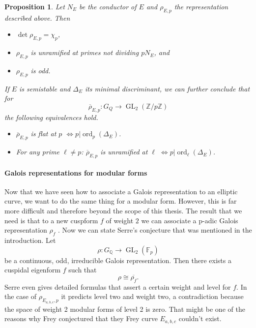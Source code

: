 \documentclass{article}
\theoremstyle{plain}%
\newtheorem{proposition}[theorem]{Proposition}
\theoremstyle{definition}
\theoremstyle{remark}
\newcommand{\GL}{\operatorname{GL}}
\begin{document}
\begin{proposition}\cite[chapter 1, theorem 2.11]{Cornell1997}\label{prop:rhoEpproperties} 
    Let \(N_E\) be the conductor of \(E\) and \(\rho_{E,p}\) the representation described above.
    Then
    \begin{itemize}
        \item \(\det \rho_{E,p} = \chi_p\),
        \item \(\rho_{E,p}\) is unramified at primes not dividing \(pN_E\), and
        \item \(\rho_{E, p}\) is odd.
    \end{itemize}
    If \(E\) is semistable and \(\Delta_E\) its minimal discriminant, we can further conclude that for
    \[
        \overline{\rho}_{E,p}\colon G_Q \to \GL_2(\mathbb{Z}/p\mathbb{Z})  
    \]
    the following equivalences hold.
    \begin{itemize}
        \item \(\overline{\rho}_{E,p}\) is flat at \(p\) \(\Leftrightarrow p| \operatorname{ord}_p(\Delta_E)\).
        \item For any prime \(\ell \neq p\): 
        \(\overline{\rho}_{E,p}\) is unramified at \(\ell\) \(\Leftrightarrow p| \operatorname{ord}_\ell(\Delta_E)\).
    \end{itemize}
\end{proposition}

\paragraph{Galois representations for modular forms}
Now that we have seen how to associate a Galois representation to an elliptic curve, we want to
do the same thing for a modular form. However, this is far more difficult and therefore beyond 
the scope of this thesis.
The result that we need is that to a new cuspform \(f\) of weight \(2\) we can associate a p-adic 
Galois representation \(\rho_f\) \cite[see][section 9.5]{Diamond2007}.
Now we can state Serre's conjecture that was mentioned in the introduction.
Let
\[
    \rho\colon G_\mathbb{Q} \to \GL_2(\mathbb{F}_p)
\]
be a continuous, odd, irreducible Galois representation. 
Then there exists a cuspidal eigenform \(f\) such that 
\[
    \rho \cong \overline{\rho_f}.
\]
Serre even gives detailed formulas that assert a certain weight and level for \(f\).
In the case of \(\rho_{E_{a,b,c},p}\) it predicts level two and weight two, a contradiction 
because the space of weight 2 modular forms of level 2 is zero.
That might be one of the reasons why Frey  conjectured that they Frey curve \(E_{a,b,c}\) couldn't exist.
\end{document}
